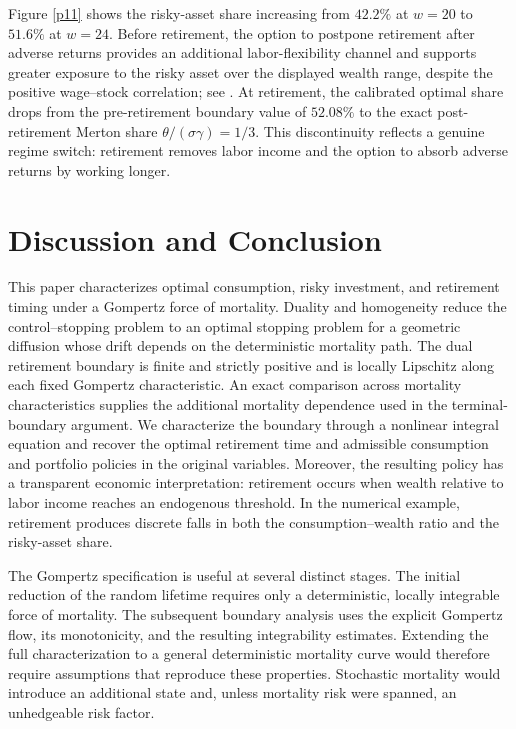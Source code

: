\documentclass[a4paper,11pt]{amsart}
\numberwithin{equation}{section}
\newcommand{\blue}[1]{{\color{black}#1}}
\begin{document}
{\blue{Figure \ref{p11} shows the risky-asset share increasing from $42.2\%$ at $w=20$ to $51.6\%$ at $w=24$. Before retirement, the option to postpone retirement after adverse returns provides an additional labor-flexibility channel and supports greater exposure to the risky asset over the displayed wealth range, despite the positive wage--stock correlation; see \citet{dybvig2010lifetime}. At retirement, the calibrated optimal share drops from the pre-retirement boundary value of $52.08\%$ to the exact post-retirement Merton share $\theta/(\sigma\gamma)=1/3$. This discontinuity reflects a genuine regime switch: retirement removes labor income and the option to absorb adverse returns by working longer.}


\section{\texorpdfstring{\blue{Discussion and Conclusion}}{Discussion and Conclusion}}\label{sec7}

\blue{This paper characterizes optimal consumption, risky investment, and retirement timing under a Gompertz force of mortality. Duality and homogeneity reduce the control--stopping problem to an optimal stopping problem for a geometric diffusion whose drift depends on the deterministic mortality path. The dual retirement boundary is finite and strictly positive and is locally Lipschitz along each fixed Gompertz characteristic. An exact comparison across mortality characteristics supplies the additional mortality dependence used in the terminal-boundary argument. We characterize the boundary through a nonlinear integral equation and recover the optimal retirement time and admissible consumption and portfolio policies in the original variables.} \blue{Moreover, the resulting policy has a transparent economic interpretation: retirement occurs when wealth relative to labor income reaches an endogenous threshold. In the numerical example, retirement produces discrete falls in both the consumption--wealth ratio and the risky-asset share. }

\blue{The Gompertz specification is useful at several distinct stages. The initial reduction of the random lifetime requires only a deterministic, locally integrable force of mortality. The subsequent boundary analysis uses the explicit Gompertz flow, its monotonicity, and the resulting integrability estimates. Extending the full characterization to a general deterministic mortality curve would therefore require assumptions that reproduce these properties. Stochastic mortality would introduce an additional state and, unless mortality risk were spanned, an unhedgeable risk factor.}

}
\end{document}
